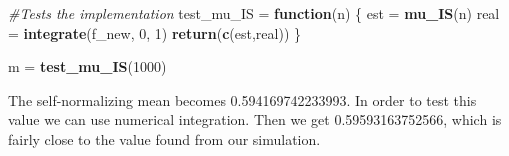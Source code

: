 \documentclass[
]{article}
\newenvironment{Shaded}{\begin{snugshade}}{\end{snugshade}}
\newcommand{\CommentTok}[1]{\textcolor[rgb]{0.56,0.35,0.01}{\textit{#1}}}
\newcommand{\ControlFlowTok}[1]{\textcolor[rgb]{0.13,0.29,0.53}{\textbf{#1}}}
\newcommand{\DecValTok}[1]{\textcolor[rgb]{0.00,0.00,0.81}{#1}}
\newcommand{\KeywordTok}[1]{\textcolor[rgb]{0.13,0.29,0.53}{\textbf{#1}}}
\newcommand{\NormalTok}[1]{#1}
\newcommand{\StringTok}[1]{\textcolor[rgb]{0.31,0.60,0.02}{#1}}
\begin{document}
\begin{Shaded}
\begin{Highlighting}[]
\CommentTok{#Tests the implementation}
\NormalTok{test_mu_IS =}\StringTok{ }\ControlFlowTok{function}\NormalTok{(n) \{}
\NormalTok{  est =}\StringTok{ }\KeywordTok{mu_IS}\NormalTok{(n)}
\NormalTok{  real =}\StringTok{ }\KeywordTok{integrate}\NormalTok{(f_new, }\DecValTok{0}\NormalTok{, }\DecValTok{1}\NormalTok{)}
  \KeywordTok{return}\NormalTok{(}\KeywordTok{c}\NormalTok{(est,real))}
\NormalTok{\}}

\NormalTok{m =}\StringTok{ }\KeywordTok{test_mu_IS}\NormalTok{(}\DecValTok{1000}\NormalTok{)}
\end{Highlighting}
\end{Shaded}

The self-normalizing mean becomes 0.594169742233993. In order to test
this value we can use numerical integration. Then we get
0.59593163752566, which is fairly close to the value found from our
simulation.
\end{document}
